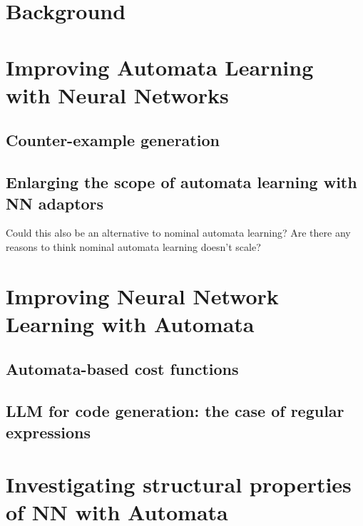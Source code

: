 \documentclass[11pt,a4paper]{article}
\begin{document}
	
	\section{Background}
	
	\section{Improving Automata Learning with Neural Networks}
		\subsection{Counter-example generation}
		\subsection{Enlarging the scope of automata learning with NN adaptors}
		Could this also be an alternative to nominal automata learning?
		Are there any reasons to think nominal automata learning doesn't scale?
		
	\section{Improving Neural Network Learning with Automata}
		\subsection{Automata-based cost functions}
		\subsection{LLM for code generation: the case of regular expressions}
	
	\section{Investigating structural properties of NN with Automata}
	
\end{document}
